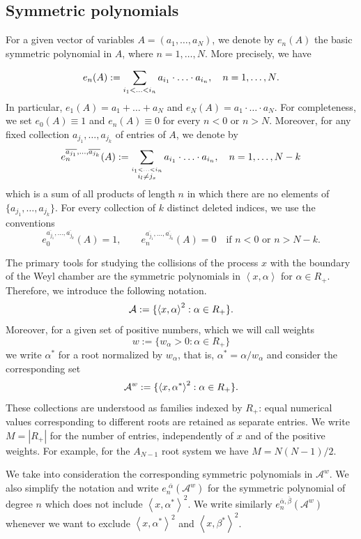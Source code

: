 \documentclass{article}
\numberwithin{equation}{section}
\newcommand{\AN}{A_{N-1}}
\newcommand{\Aaclear}{\mathcal{A}}
\newcommand{\Aa}{\mathcal{A}^{w}}
\newcommand{\xa}{\left<x,\alpha\right>}
\newcommand{\xas}{\left<x,\alpha^*\right>}
\newcommand{\xbs}{\left<x,\beta^*\right>}
\newcommand{\aR}{\alpha\in R_+}
\newcommand{\shift}{\,\,}
\newcommand{\eaA}[1]{e_{#1}^{\shift\overline{\alpha}}(\Aa)}
\newcommand{\eabA}[1]{e_{#1}^{\overline{\alpha}, \overline{\beta}}(\Aa)}
\theoremstyle{plain}
\begin{document}

\subsection{Symmetric polynomials}

For a given vector of variables $A=(a_1,\ldots,a_N)$, we denote by $e_n(A)$ the basic symmetric polynomial in $A$, where $n=1,\ldots,N$. More precisely, we have

$$
	e_n(A) := \sum_{i_1<\ldots<i_n} a_{i_1}\cdot\ldots\cdot a_{i_n}\/,\quad n=1,\ldots,N\/.
$$
In particular, $e_1(A) = a_1+\ldots+a_N$ and $e_{N}(A) = a_1\cdot\ldots\cdot a_N$. For completeness, we set $e_0(A)\equiv 1$ and $e_{n}(A)\equiv 0$ for every $n<0$ or $n>N$. Moreover, for any fixed collection $a_{j_1}, \ldots, a_{j_k}$ of entries of $A$, we denote by
$$
	e^{\overline{a_{j_1}},\ldots,\overline{a_{j_k}}}_n(A) :=  \sum_{\stackrel{i_1<\ldots<i_n}{i_l\neq j_s}} a_{i_1}\cdot\ldots\cdot a_{i_n}\/, \quad n=1,\dots, N-k
$$
which is a sum of all products of length $n$ in which there are no elements of $\{a_{j_1}, \ldots, a_{j_k}\}$. 
For every collection of $k$ distinct deleted indices, we use the conventions
    \begin{equation*}
        e_0^{\overline{a_{j_1}},\ldots,\overline{a_{j_k}}}(A)=1, \qquad
        e_n^{\overline{a_{j_1}},\ldots,\overline{a_{j_k}}}(A)=0 \quad\text{if }n<0\text{ or }n>N-k.
    \end{equation*}

\medskip

\noindent The primary tools for studying the collisions of the process $x$ with the boundary of the Weyl chamber are the symmetric polynomials in $\xa$ for $\aR$. Therefore, we introduce the following notation.
$$
	\Aaclear := \{\xa^2:\aR\}\/.
$$
Moreover, for a given set of positive numbers, which we will call weights
$$
	w := \{w_\alpha>0: \aR\}
$$
we write $\alpha^*$ for a root normalized by $w_\alpha$, that is, $\alpha^* = \alpha/w_\alpha$ and consider the corresponding set 
$$
	\Aa := \{\xas^2:\aR\}\/.
$$
These collections are understood as families indexed by $R_+$: equal numerical values corresponding to different roots are retained as separate entries. We write $M=|R_+|$ for the number of entries, independently of $x$ and of the positive weights. For example, for the $\AN$ root system we have $M=N(N-1)/2$.


We take into consideration the corresponding symmetric polynomials in $\Aa$. We also simplify the notation and write $\eaA{n}$ for the symmetric polynomial of degree $n$ which does not include $\xas^2$. We write similarly $\eabA{n}$ whenever we want to exclude $\xas^2$ and $\xbs^2$. 
\end{document}
